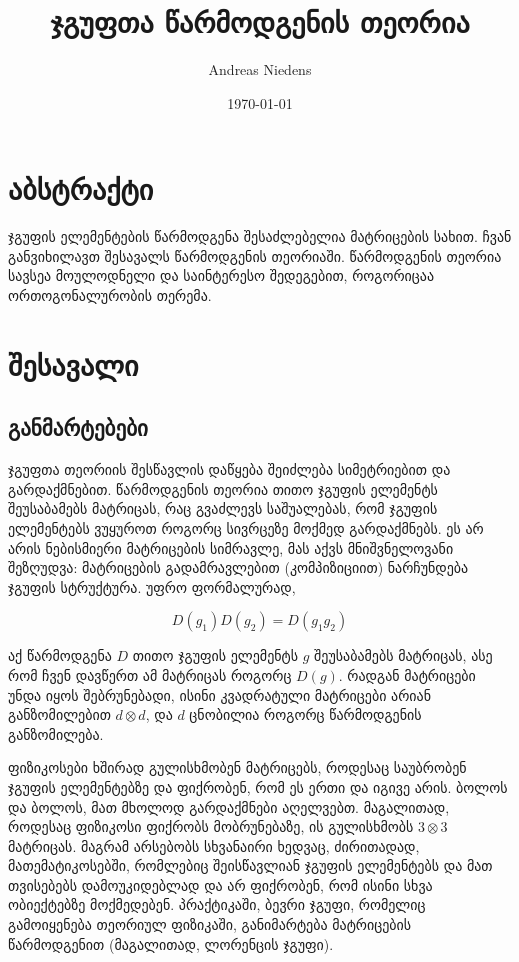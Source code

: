 \documentclass[12pt]{article}
\begin{document}
\title{ჯგუფთა წარმოდგენის თეორია}
\author{Andreas Niedens}
\date{\today}
\maketitle

\tableofcontents

\begin{sloppypar}
\section{აბსტრაქტი}
ჯგუფის ელემენტების წარმოდგენა შესაძლებელია მატრიცების სახით. ჩვან განვიხილავთ შესავალს წარმოდგენის თეორიაში. წარმოდგენის თეორია სავსეა მოულოდნელი და საინტერესო შედეგებით, როგორიცაა ორთოგონალურობის თერემა.

\section{შესავალი}

\subsection{განმარტებები}
ჯგუფთა თეორიის შესწავლის დაწყება შეიძლება სიმეტრიებით და გარდაქმნებით. წარმოდგენის თეორია თითო ჯგუფის ელემენტს შეუსაბამებს მატრიცას, რაც გვაძლევს საშუალებას, რომ ჯგუფის ელემენტებს ვუყუროთ როგორც სივრცეზე მოქმედ გარდაქმნებს. ეს არ არის ნებისმიერი მატრიცების სიმრავლე, მას აქვს მნიშვნელოვანი შეზღუდვა: მატრიცების გადამრავლებით (კომპიზიციით) ნარჩუნდება ჯგუფის სტრუქტურა. უფრო ფორმალურად,

\begin{equation} \label{Representation equation}
		D(g_1)D(g_2) = D(g_1 g_2)
\end{equation}
	
აქ წარმოდგენა $D$ თითო ჯგუფის ელემენტს $g$ შეუსაბამებს მატრიცას, ასე რომ ჩვენ დავწერთ ამ მატრიცას როგორც $D(g)$. რადგან მატრიცები უნდა იყოს შებრუნებადი, ისინი კვადრატული მატრიცები არიან განზომილებით $d \otimes d$, და $d$ ცნობილია როგორც წარმოდგენის განზომილება.


ფიზიკოსები ხშირად გულისხმობენ მატრიცებს, როდესაც საუბრობენ ჯგუფის ელემენტებზე და ფიქრობენ, რომ ეს ერთი და იგივე არის. ბოლოს და ბოლოს, მათ მხოლოდ გარდაქმნები აღელვებთ. მაგალითად, როდესაც ფიზიკოსი ფიქრობს მობრუნებაზე, ის გულისხმობს $3 \otimes 3$ მატრიცას. მაგრამ არსებობს სხვანაირი ხედვაც, ძირითადად, მათემატიკოსებში, რომლებიც შეისწავლიან ჯგუფის ელემენტებს და მათ თვისებებს დამოუკიდებლად და არ ფიქრობენ, რომ ისინი სხვა ობიექტებზე მოქმედებენ. პრაქტიკაში, ბევრი ჯგუფი, რომელიც გამოიყენება თეორიულ ფიზიკაში, განიმარტება მატრიცების წარმოდგენით (მაგალითად, ლორენცის ჯგუფი).



\end{sloppypar}
\end{document}
